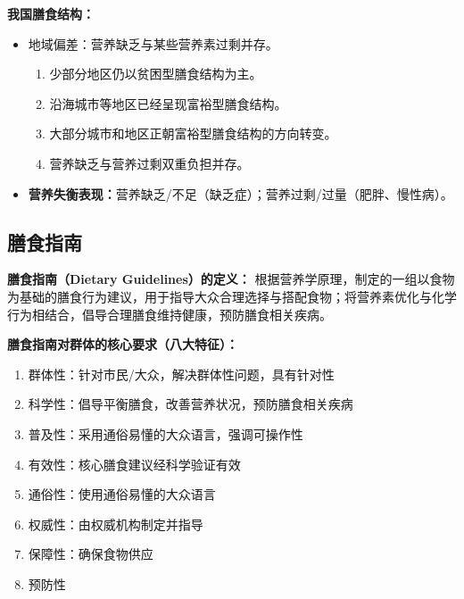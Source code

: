 \begin{keybox}
\textbf{我国膳食结构：}
\begin{itemize}[leftmargin=*]
    \item 地域偏差：营养缺乏与某些营养素过剩并存。
    \begin{enumerate}[leftmargin=*]
        \item 少部分地区仍以贫困型膳食结构为主。
        \item 沿海城市等地区已经呈现富裕型膳食结构。
        \item 大部分城市和地区正朝富裕型膳食结构的方向转变。
        \item 营养缺乏与营养过剩双重负担并存。
    \end{enumerate}
    \item \textbf{营养失衡表现：}营养缺乏/不足（缺乏症）；营养过剩/过量（肥胖、慢性病）。
\end{itemize}
\end{keybox}

\subsection{膳食指南}

\begin{defbox}
\textbf{膳食指南（Dietary Guidelines）的定义：}
根据营养学原理，制定的一组以食物为基础的膳食行为建议，用于指导大众合理选择与搭配食物；将营养素优化与化学行为相结合，倡导合理膳食维持健康，预防膳食相关疾病。%

\textbf{膳食指南对群体的核心要求（八大特征）：}
\begin{enumerate}[leftmargin=*]
    \item 群体性：针对市民/大众，解决群体性问题，具有针对性
    \item 科学性：倡导平衡膳食，改善营养状况，预防膳食相关疾病
    \item 普及性：采用通俗易懂的大众语言，强调可操作性
    \item 有效性：核心膳食建议经科学验证有效
    \item 通俗性：使用通俗易懂的大众语言
    \item 权威性：由权威机构制定并指导
    \item 保障性：确保食物供应
    \item 预防性
\end{enumerate}
\end{defbox}

